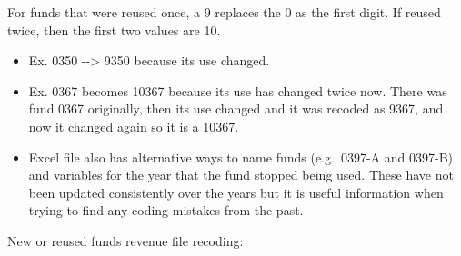 \documentclass[
  letterpaper,
  DIV=11,
  numbers=noendperiod]{scrreport}
\providecommand{\tightlist}{%
  \setlength{\itemsep}{0pt}\setlength{\parskip}{0pt}}\usepackage{longtable,booktabs,array}
\begin{document}
For funds that were reused once, a 9 replaces the 0 as the first digit.
If reused twice, then the first two values are 10.

\begin{itemize}
\tightlist
\item
  Ex. 0350 -\/-\textgreater{} 9350 because its use changed.
\item
  Ex. 0367 becomes 10367 because its use has changed twice now. There
  was fund 0367 originally, then its use changed and it was recoded as
  9367, and now it changed again so it is a 10367.
\item
  Excel file also has alternative ways to name funds (e.g.~0397-A and
  0397-B) and variables for the year that the fund stopped being used.
  These have not been updated consistently over the years but it is
  useful information when trying to find any coding mistakes from the
  past.
\end{itemize}

New or reused funds revenue file recoding:
\end{document}

